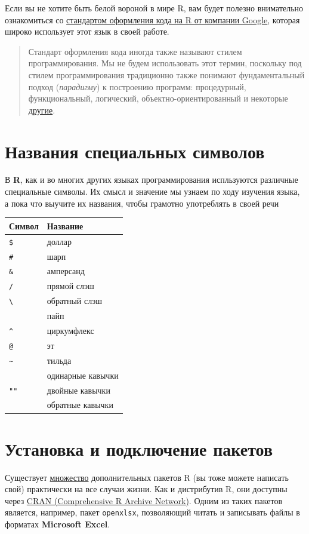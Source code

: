 \documentclass[]{book}
\begin{document}
Если вы не хотите быть белой вороной в мире R, вам будет полезно
внимательно ознакомиться со
\href{https://google.github.io/styleguide/Rguide.xml\#filenames}{стандартом
оформления кода на R от компании Google}, которая широко использует этот
язык в своей работе.

\begin{quote}
Стандарт оформления кода иногда также называют стилем программирования.
Мы не будем использовать этот термин, поскольку под стилем
программирования традиционно также понимают фундаментальный подход
(\emph{парадигму}) к построению программ: процедурный, функциональный,
логический, объектно-ориентированный и некоторые
\href{https://ru.wikipedia.org/wiki/Парадигма_программирования}{другие}.
\end{quote}

\section*{Названия специальных символов}\label{--}

В \textbf{R}, как и во многих других языках программирования испльзуются
различные специальные символы. Их смысл и значение мы узнаем по ходу
изучения языка, а пока что выучите их названия, чтобы грамотно
употреблять в своей речи

\begin{longtable}[]{@{}ll@{}}
\toprule
Символ & Название\tabularnewline
\midrule
\endhead
\texttt{\$} & доллар\tabularnewline
\texttt{\#} & шарп\tabularnewline
\texttt{\&} & амперсанд\tabularnewline
\texttt{/} & прямой слэш\tabularnewline
\texttt{\textbackslash{}} & обратный слэш\tabularnewline
\texttt{\textbar{}} & пайп\tabularnewline
\texttt{\^{}} & циркумфлекс\tabularnewline
\texttt{@} & эт\tabularnewline
\texttt{\textasciitilde{}} & тильда\tabularnewline
\texttt{\textquotesingle{}\textquotesingle{}} & одинарные
кавычки\tabularnewline
\texttt{""} & двойные кавычки\tabularnewline
\texttt{\textasciigrave{}\textasciigrave{}} & обратные
кавычки\tabularnewline
\bottomrule
\end{longtable}

\section*{Установка и подключение пакетов}\label{---}

Существует \href{https://cran.r-project.org/web/packages/}{множество}
дополнительных пакетов R (вы тоже можете написать свой) практически на
все случаи жизни. Как и дистрибутив R, они доступны через
\href{https://cran.r-project.org}{CRAN (Comprehensive R Archive
Network)}. Одним из таких пакетов является, например, пакет
\texttt{openxlsx}, позволяющий читать и записывать файлы в форматах
\textbf{Microsoft Excel}.
\end{document}
